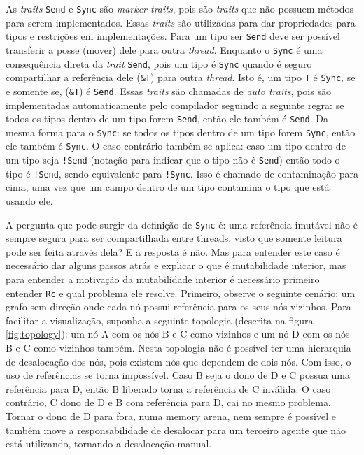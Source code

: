 As \textit{traits} \texttt{Send} e \texttt{Sync} são \textit{marker traits}, pois são \textit{traits} que não possuem métodos para serem implementados. Essas \textit{traits} são utilizadas para dar propriedades para tipos e restrições em implementações. Para um tipo ser \texttt{Send} deve ser possível transferir a posse (mover) dele para outra \textit{thread}. Enquanto o \texttt{Sync} é uma consequência direta da \textit{trait} \texttt{Send}, pois um tipo é \texttt{Sync} quando é seguro compartilhar a referência dele (\texttt{\&T}) para outra \textit{thread}. Isto é, um tipo \texttt{T} é \texttt{Sync}, se e somente se, (\texttt{\&T}) é \texttt{Send}. Essas \textit{traits} são chamadas de \textit{auto traits}, pois são implementadas automaticamente pelo compilador seguindo a seguinte regra: se todos os tipos dentro de um tipo forem \texttt{Send}, então ele também é \texttt{Send}. Da mesma forma para o \texttt{Sync}: se todos os tipos dentro de um tipo forem \texttt{Sync}, então ele também é \texttt{Sync}. O caso contrário também se aplica: caso um tipo dentro de um tipo seja \texttt{!Send} (notação para indicar que o tipo não é \texttt{Send}) então todo o tipo é \texttt{!Send}, sendo equivalente para \texttt{!Sync}. Isso é chamado de contaminação para cima, uma vez que um campo dentro de um tipo contamina o tipo que está usando ele.

A pergunta que pode surgir da definição de \texttt{Sync} é: uma referência imutável não é sempre segura para ser compartilhada entre threads, visto que somente leitura pode ser feita através dela? E a resposta é não. Mas para entender este caso é necessário dar alguns passos atrás e explicar o que é mutabilidade interior, mas para entender a motivação da mutabilidade interior é necessário primeiro entender \texttt{Rc} e qual problema ele resolve. Primeiro, observe o seguinte cenário: um grafo sem direção onde cada nó possui referência para os seus nós vizinhos. Para facilitar a visualização, suponha a seguinte topologia (descrita na figura \ref{fig:topology}): um nó A com os nós B e C como vizinhos e um nó D com os nós B e C como vizinhos também. Nesta topologia não é possível ter uma hierarquia de desalocação dos nós, pois existem nós que dependem de dois nós. Com isso, o uso de referências se torna impossível. Caso B seja o dono de D e C possua uma referência para D, então B liberado torna a referência de C inválida. O caso contrário, C dono de D e B com referência para D, cai no mesmo problema. Tornar o dono de D para fora, numa memory arena, nem sempre é possível e também move a responsabilidade de desalocar para um terceiro agente que não está utilizando, tornando a desalocação manual. 


